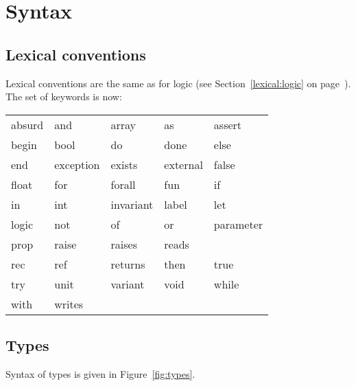 \documentclass[a4paper,12pt]{report}
\begin{document}
\section{Syntax}
\label{syntax}

\subsection{Lexical conventions}
\label{lexical}

Lexical conventions are the same as for logic (see
Section~\ref{lexical:logic} on page~\pageref{lexical:logic}).
The set of keywords is now:
\begin{center}
{\tt\begin{tabular}{l@{\qquad}l@{\qquad}l@{\qquad}l@{\qquad}l}
absurd & and & array & as & assert  \\
begin & bool & do & done & else  \\
end & exception & exists & external & false  \\
float & for & forall & fun & if  \\
in & int & invariant & label & let  \\
logic & not & of & or & parameter \\
prop & raise & raises & reads \\
rec & ref & returns & then & true \\
try & unit & variant & void & while \\
with & writes
\end{tabular}}
\end{center}

\subsection{Types}
\label{syntax:types}

Syntax of types is given in Figure~\ref{fig:types}.
\end{document}
